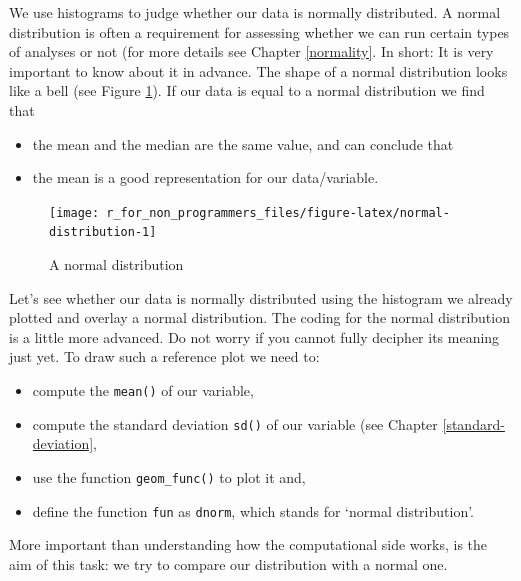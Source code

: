 \documentclass[
]{book}
\begin{document}
We use histograms to judge whether our data is normally distributed. A normal distribution is often a requirement for assessing whether we can run certain types of analyses or not (for more details see Chapter \ref{normality}. In short: It is very important to know about it in advance. The shape of a normal distribution looks like a bell (see Figure \ref{fig:normal-distribution}). If our data is equal to a normal distribution we find that

\begin{itemize}
\item
  the mean and the median are the same value, and can conclude that
\item
  the mean is a good representation for our data/variable.
\end{itemize}

\begin{figure}

{\centering \texttt{[image: r\_for\_non\_programmers\_files/figure-latex/normal-distribution-1]} 

}

\caption{A normal distribution}\label{fig:normal-distribution}
\end{figure}

Let's see whether our data is normally distributed using the histogram we already plotted and overlay a normal distribution. The coding for the normal distribution is a little more advanced. Do not worry if you cannot fully decipher its meaning just yet. To draw such a reference plot we need to:

\begin{itemize}
\item
  compute the \texttt{mean()} of our variable,
\item
  compute the standard deviation \texttt{sd()} of our variable (see Chapter \ref{standard-deviation},
\item
  use the function \texttt{geom\_func()} to plot it and,
\item
  define the function \texttt{fun} as \texttt{dnorm}, which stands for `normal distribution'.
\end{itemize}

More important than understanding how the computational side works, is the aim of this task: we try to compare our distribution with a normal one.
\end{document}
